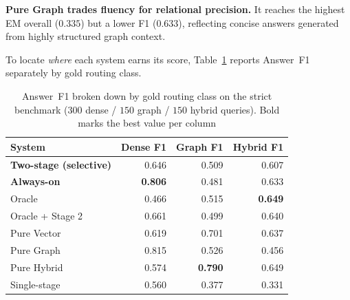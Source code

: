 \noindent\textbf{Pure Graph trades fluency for relational precision.} It
reaches the highest EM overall ($0.335$) but a lower F1 ($0.633$), reflecting
concise answers generated from highly structured graph context.

To locate \emph{where} each system earns its score,
Table~\ref{tab:per_class_f1} reports Answer~F1 separately by gold routing
class.

\begin{table}[!htbp]
\centering
\caption{Answer~F1 broken down by gold routing class on the strict benchmark
($300$ dense / $150$ graph / $150$ hybrid queries). Bold marks the best value
per column}\label{tab:per_class_f1}
\begin{tabular}{lrrr}
\toprule
\textbf{System} & \textbf{Dense F1} & \textbf{Graph F1} & \textbf{Hybrid F1} \\
\midrule
        \textbf{Two-stage (selective)} & 0.646 & 0.509 & 0.607 \\
        \textbf{Always-on}             & \textbf{0.806} & 0.481 & 0.633 \\
        Oracle                         & 0.466 & 0.515 & \textbf{0.649} \\
        Oracle + Stage 2               & 0.661 & 0.499 & 0.640 \\ \midrule
        Pure Vector                    & 0.619 & 0.701 & 0.637 \\
        Pure Graph                     & 0.815 & 0.526 & 0.456 \\
        Pure Hybrid                    & 0.574 & \textbf{0.790} & 0.649 \\
        Single-stage                   & 0.560 & 0.377 & 0.331 \\
\bottomrule
\end{tabular}
\end{table}

